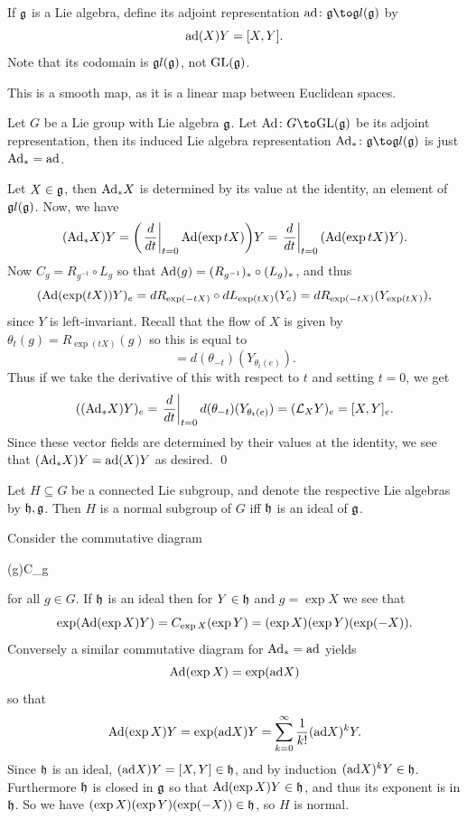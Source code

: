 \eproof

\bdefn

    If ${{\frak g}}$ is a Lie algebra, define its {\emphcolor adjoint representation} $\ad\colon\g\to\lgl(\g)$ by
    $$ {\rm ad}(X)Y = [X,Y] . $$
    Note that its codomain is ${\frak gl}({{\frak g}})$, not ${\rm GL}({{\frak g}})$.

\edefn

This is a smooth map, as it is a linear map between Euclidean spaces.

\bthrm

    Let $G$ be a Lie group with Lie algebra ${{\frak g}}$.
    Let $\Ad\colon G\to\gl(\g)$ be its adjoint representation, then its induced Lie algebra representation $\Ad_*\colon\g\to\lgl(\g)$
    is just ${\rm Ad}_*={\rm ad}$.

\ethrm

\bproof

    Let $X\in{{\frak g}}$, then ${\rm Ad}_*X$ is determined by its value at the identity, an element of ${\frak gl}({{\frak g}})$.
    Now, we have
    $$ ({\rm Ad}_*X)Y = \mathopen{}\mathclose{\left(\left.{{d}\over{dt}}\right|_{t=0}{\rm Ad}(\exp tX)\right)}Y = \left.{{d}\over{dt}}\right|_{t=0}({\rm Ad}(\exp tX)Y) . $$
    Now $C_g=R_{g^{-1}}\circ L_g$ so that ${\rm Ad}(g)=(R_{g^{-1}})_*\circ(L_g)_*$, and thus
    $$ ({\rm Ad}(\exp(tX))Y)_e = dR_{\exp(-tX)}\circ dL_{\exp(tX)}(Y_e) = dR_{\exp(-tX)}(Y_{\exp(tX)}) , $$
    since $Y$ is left-invariant.
    Recall that the flow of $X$ is given by $\theta_t(g)=R_{\exp(tX)}(g)$ so this is equal to
    $$ = d(\theta_{-t})(Y_{\theta_t(e)}) . $$
    Thus if we take the derivative of this with respect to $t$ and setting $t=0$, we get
    $$ (({\rm Ad}_*X)Y)_e = \left.{{d}\over{dt}}\right|_{t=0}d(\theta_{-t})(Y_{\theta_t(e)}) = ({{\cal L}}_XY)_e = [X,Y]_e . $$
    Since these vector fields are determined by their values at the identity, we see that $({\rm Ad}_*X)Y={\rm ad}(X)Y$ as desired.
    \qed

\eproof

\bthrm

    Let $H\subseteq G$ be a connected Lie subgroup, and denote the respective Lie algebras by ${{\frak h}},{{\frak g}}$.
    Then $H$ is a normal subgroup of $G$ iff ${{\frak h}}$ is an ideal of ${{\frak g}}$.

\ethrm

\bproof

    Consider the commutative diagram

        {\Ad(g)}{C_g}{\exp}{\exp}

    for all $g\in G$.
    If ${{\frak h}}$ is an ideal then for $Y\in{{\frak h}}$ and $g=\exp X$ we see that
    $$ \exp({\rm Ad}(\exp X)Y) = C_{\exp X}(\exp Y) = (\exp X)(\exp Y)(\exp(-X)) . $$
    Conversely a similar commutative diagram for ${\rm Ad}_*={\rm ad}$ yields
    $$ {\rm Ad}(\exp X) = \exp({\rm ad} X) $$
    so that
    $$ {\rm Ad}(\exp X)Y = \exp({\rm ad} X)Y = \sum_{k=0}^\infty{{1}\over{k!}}({\rm ad} X)^kY . $$
    Since ${{\frak h}}$ is an ideal, $({\rm ad} X)Y=[X,Y]\in{{\frak h}}$, and by induction $({\rm ad} X)^kY\in{{\frak h}}$.
    Furthermore ${{\frak h}}$ is closed in ${{\frak g}}$ so that ${\rm Ad}(\exp X)Y\in{{\frak h}}$, and thus its exponent is in ${{\frak h}}$.
    So we have $(\exp X)(\exp Y)(\exp(-X))\in{{\frak h}}$, so $H$ is normal.

